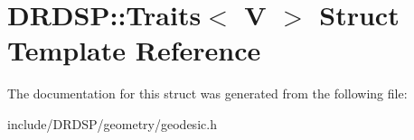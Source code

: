 \hypertarget{struct_d_r_d_s_p_1_1_traits}{\section{D\-R\-D\-S\-P\-:\-:Traits$<$ V $>$ Struct Template Reference}
\label{struct_d_r_d_s_p_1_1_traits}
}


The documentation for this struct was generated from the following file\-:\begin{DoxyCompactItemize}
\item 
include/\-D\-R\-D\-S\-P/geometry/geodesic.\-h\end{DoxyCompactItemize}
